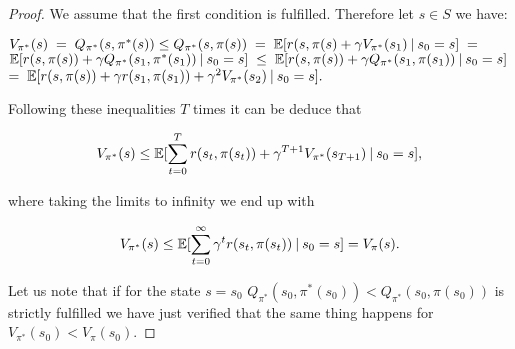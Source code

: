 \documentclass[12pt]{article}
\numberwithin{equation}{section}
\begin{document}
 
 \begin{proof} 

 
 
  We assume that the first condition is fulfilled. Therefore let $ s\in S$ we have:\\ [-10pt]


   \begin{ecuation*}
  $V_{\pi^*}(s)  \hspace{1mm} = \hspace{1mm} Q_{\pi^*}(s,\pi^*(s)) \leq Q_{\pi^*}(s,\pi(s))   \hspace{1mm}=  \hspace{1mm} \mathbb{E}[r(s,\pi(s) +\gamma V_{\pi^*}(s_1)\hspace{0.75mm} | \hspace{0.75mm} s_0=s]  \hspace{1mm} =$ \\ [-12pt]
  
  $\mathbb{E} [r(s,\pi(s)) +\gamma Q_{\pi^*}(s_1,\pi^*(s_1)) \hspace{0.75mm} | \hspace{0.75mm} s_0=s]  \hspace{1mm} \leq \hspace{1mm} \mathbb{E} [r(s,\pi(s)) +\gamma Q_{\pi^*}(s_1,\pi(s_1)) \hspace{0.75mm} | \hspace{0.75mm} s_0=s]$\\ [-12pt]
  
  $=  \hspace{1mm} \mathbb{E}[r(s,\pi(s)) +\gamma  r(s_1,\pi(s_1)) + \gamma^2 V_{\pi^*}(s_2)\hspace{0.75mm} | \hspace{0.75mm} s_0=s].$\\[-12pt]

\end{ecuation*}


 Following these inequalities $T$ times it can  be deduce that

$$ V_{\pi^*}(s) \leq \mathbb{E}[\sum_{t=0}^{T} r(s_t,\pi(s_t))  + \gamma^{T+1} V_{\pi^*}(s_{T+1})\hspace{0.75mm} | \hspace{0.75mm} s_0=s], $$

 where taking the limits to infinity we end up with

  $$ V_{\pi^*}(s) \leq \mathbb{E}[\sum_{t=0}^{\infty}\gamma^{t} r(s_t,\pi(s_t)) \hspace{0.75mm} | \hspace{0.75mm} s_0=s] = V_{\pi}(s).$$



  Let us note that if for the state $s=s_0$  \hspace{2mm} $Q_{\pi^*}(s_0,\pi^*(s_0))< Q_{\pi^*}(s_0,\pi(s_0))$ is strictly fulfilled we have just verified that the same thing happens for $ V_{\pi^*}(s_0) < V_{\pi}(s_0)$.
  
\end{proof}
\end{document}
